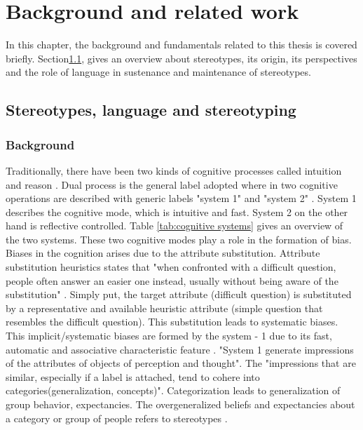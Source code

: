 \chapter{Background and related work}

In this chapter, the background and fundamentals related to this thesis is covered briefly. Section\ref{stereotypes, language}, gives an overview about stereotypes, its origin, its perspectives and the role of language in sustenance and maintenance of stereotypes. 

\section{Stereotypes, language and stereotyping} \label{stereotypes, language}
\subsection{Background}

Traditionally, there have been two kinds of cognitive processes called intuition and reason \cite{kahneman2002representativeness}. Dual process is the general label adopted where in two cognitive operations are described with generic labels "system 1" and "system 2" \cite{kahneman2002representativeness}. System 1 describes the cognitive mode, which is intuitive and fast. System 2 on the other hand is reflective  controlled. Table \ref{tab:cognitive systems} gives an overview of the two systems. These two cognitive modes play a role in the formation of bias. Biases in the cognition arises due to the attribute substitution. Attribute substitution heuristics states that "when confronted with a difficult question, people often answer an easier one instead, usually
without being aware of the substitution" \cite{kahneman2002representativeness}. Simply put, the target attribute (difficult question) is substituted by a representative and available heuristic attribute (simple question that resembles the difficult question). This substitution leads to systematic biases. This implicit/systematic biases are formed by the system - 1 due to its fast, automatic and associative characteristic feature \cite{kahneman2002representativeness}. "System 1 generate impressions of the attributes of objects of perception and thought"\cite{kahneman2003maps}. The "impressions that are similar, especially if a label is attached, tend to cohere into categories(generalization, concepts)"\cite{fiske1998stereotyping}. Categorization leads to generalization of group behavior, expectancies. The overgeneralized beliefs and expectancies about a category or group of people refers to stereotypes \cite{allport1954nature}\cite{fiske1998stereotyping}. 

